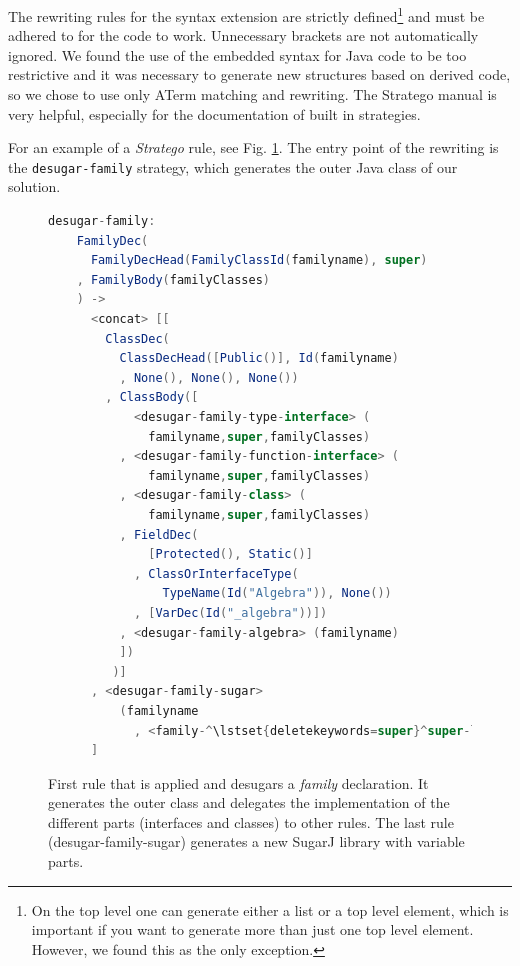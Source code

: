 \documentclass{report}
\begin{document}
The rewriting rules for the syntax extension are strictly defined\footnote{On the top level one can generate either a list or a top level element, which is important if you want to generate more than just one top level element. However, we found this as the only exception.} and must be adhered to for the code to work. Unnecessary brackets are not automatically ignored. We found the use of the embedded syntax for Java code to be too restrictive and it was necessary to generate new structures based on derived code, so we chose to use only ATerm matching and rewriting. The Stratego manual \cite{Stratego-Manual} is very helpful, especially for the documentation of built in strategies.

For an example of a \emph{Stratego} rule, see Fig. \ref{exampleStrategoClassInterfaceTranslation}. The entry point of the rewriting is the \lstinline{desugar-family} strategy, which generates the outer Java class of our solution.

\begin{figure}[H]
\begin{lstlisting}[language=java,breaklines=false,morekeywords={familyname,super,familyClasses},alsoletter={-},keywordstyle=\bfseries\color{OliveGreen}]
  desugar-family:
    FamilyDec(
      FamilyDecHead(FamilyClassId(familyname), super)
    , FamilyBody(familyClasses)
    ) ->
      <concat> [[
        ClassDec(
          ClassDecHead([Public()], Id(familyname)
          , None(), None(), None())
        , ClassBody([
            <desugar-family-type-interface> (
              familyname,super,familyClasses)
          , <desugar-family-function-interface> (
              familyname,super,familyClasses)
          , <desugar-family-class> (
              familyname,super,familyClasses)
          , FieldDec(
              [Protected(), Static()]
            , ClassOrInterfaceType(
                TypeName(Id("Algebra")), None())
            , [VarDec(Id("_algebra"))])
          , <desugar-family-algebra> (familyname)
          ])
	     )]
      , <desugar-family-sugar>
          (familyname
            , <family-^\lstset{deletekeywords=super}^super-list>super,familyClasses)
      ]
\end{lstlisting}
\caption{First rule that is applied and desugars a \emph{family} declaration. It generates the outer class and delegates the implementation of the different parts (interfaces and classes) to other rules. The last rule (desugar-family-sugar) generates a new SugarJ library with variable parts.}
\label{exampleStrategoClassInterfaceTranslation}
\end{figure}
\end{document}
